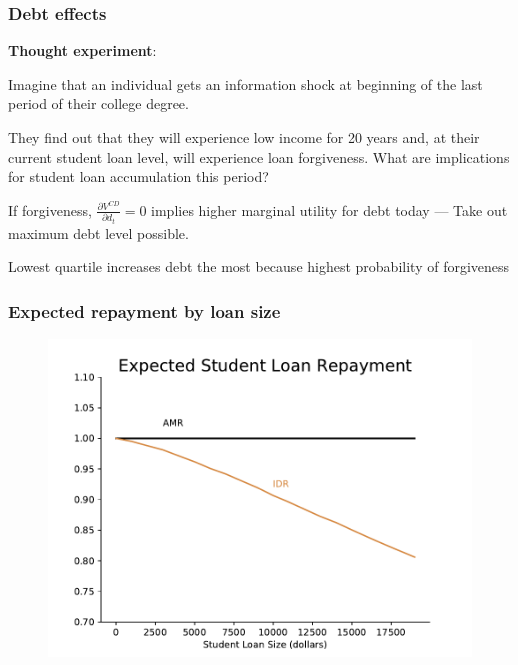 \documentclass[10pt]{beamer}
\begin{document}
  \begin{frame} \frametitle{Debt effects}

    \textbf{Thought experiment}:

    Imagine that an individual gets an information shock at beginning of the last period of their
    college degree.

    \vspace{0.1cm}

    They find out that they will experience low income for 20 years and, at their current student
    loan level, will experience loan forgiveness. What are implications for student loan
    accumulation this period?

    \vspace{0.1cm}

    If forgiveness, $\frac{\partial V^{CD}}{\partial d_t} = 0$ implies higher marginal utility for
    debt today --- Take out maximum debt level possible.

    \vspace{0.3cm}

    Lowest quartile increases debt the most because highest probability of forgiveness

  \end{frame}

  \begin{frame} \frametitle{Expected repayment by loan size}

    \begin{figure}
      \begin{center}
       \includegraphics[width=\textwidth]{../ms/images/StudentLoans/expected_repayment.pdf}
      \end{center}
    \end{figure}

  \end{frame}
\end{document}
